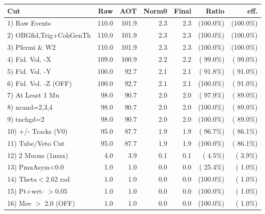  \begin{table}[h!]\centering
 \begin{tabular}{||l||r|r|r|r|r|r||}
 \hline
 \hline
 Cut & Raw & AOT & Norm0 & Final & Ratio & eff.       \\
 \hline
  1) Raw Events           &        110.0 &        101.9 &          2.3 &          2.3 & (100.0\%) & (100.0\%) \\
  2) OBGfid,Trig+CohGenTh &        110.0 &        101.9 &          2.3 &          2.3 & (100.0\%) & (100.0\%) \\
  3) Pfermi \& W2         &        110.0 &        101.9 &          2.3 &          2.3 & (100.0\%) & (100.0\%) \\
  4) Fid. Vol. -X         &        109.0 &        100.9 &          2.2 &          2.2 & ( 99.0\%) & ( 99.0\%) \\
  5) Fid. Vol. -Y         &        100.0 &         92.7 &          2.1 &          2.1 & ( 91.8\%) & ( 91.0\%) \\
  6) Fid. Vol. -Z (OFF)   &        100.0 &         92.7 &          2.1 &          2.1 & (100.0\%) & ( 91.0\%) \\
  7) At Least 1 Mu        &         98.0 &         90.7 &          2.0 &          2.0 & ( 97.9\%) & ( 89.0\%) \\
  8) ncand=2,3,4          &         98.0 &         90.7 &          2.0 &          2.0 & (100.0\%) & ( 89.0\%) \\
  9) tnchgd=2             &         98.0 &         90.7 &          2.0 &          2.0 & (100.0\%) & ( 89.0\%) \\
 10) +/- Tracks (V0)      &         95.0 &         87.7 &          1.9 &          1.9 & ( 96.7\%) & ( 86.1\%) \\
 11) Tube/Veto Cut        &         95.0 &         87.7 &          1.9 &          1.9 & (100.0\%) & ( 86.1\%) \\
 12) 2 Muons (1mux)       &          4.0 &          3.9 &          0.1 &          0.1 & (  4.5\%) & (  3.9\%) \\
 13) PmuAsym<0.0          &          1.0 &          1.0 &          0.0 &          0.0 & ( 25.4\%) & (  1.0\%) \\
 14) Theta$<$2.62 rad     &          1.0 &          1.0 &          0.0 &          0.0 & (100.0\%) & (  1.0\%) \\
 15) Pt+wrt- $>$0.05      &          1.0 &          1.0 &          0.0 &          0.0 & (100.0\%) & (  1.0\%) \\
 16) Mee $>$ 2.0  (OFF)   &          1.0 &          1.0 &          0.0 &          0.0 & (100.0\%) & (  1.0\%) \\

\end{tabular}
\end{table}

